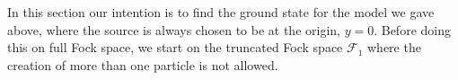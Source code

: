 In this section our intention is to find the ground state for the model we gave above, where the source is always chosen to be at the origin, $y = 0$. Before doing this on full Fock space, we start on the truncated Fock space $\mathcal{F}_{1}$ where the creation of more than one particle is not allowed.
